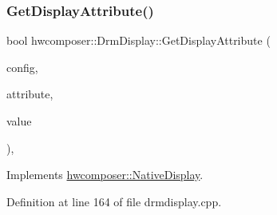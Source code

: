 \subsubsection{\texorpdfstring{Get\+Display\+Attribute()}{GetDisplayAttribute()}}
{\footnotesize\ttfamily bool hwcomposer\+::\+Drm\+Display\+::\+Get\+Display\+Attribute (\begin{DoxyParamCaption}\item[{uint32\+\_\+t}]{config,  }\item[{H\+W\+C\+Display\+Attribute}]{attribute,  }\item[{int32\+\_\+t $\ast$}]{value }\end{DoxyParamCaption})\hspace{0.3cm}{\ttfamily [override]}, {\ttfamily [virtual]}}



Implements \mbox{\hyperlink{classhwcomposer_1_1NativeDisplay_aeb880e4a295eab49a98804380c2dcb84}{hwcomposer\+::\+Native\+Display}}.



Definition at line 164 of file drmdisplay.\+cpp.


